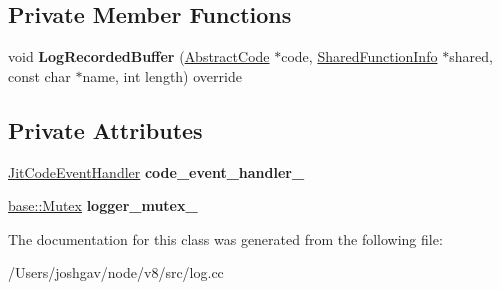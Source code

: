 \subsection*{Private Member Functions}
\begin{DoxyCompactItemize}
\item 
void {\bfseries Log\+Recorded\+Buffer} (\hyperlink{classv8_1_1internal_1_1_abstract_code}{Abstract\+Code} $\ast$code, \hyperlink{classv8_1_1internal_1_1_shared_function_info}{Shared\+Function\+Info} $\ast$shared, const char $\ast$name, int length) override\hypertarget{classv8_1_1internal_1_1_jit_logger_aa77a25ba8f66743339e93a18d75623e9}{}\label{classv8_1_1internal_1_1_jit_logger_aa77a25ba8f66743339e93a18d75623e9}

\end{DoxyCompactItemize}
\subsection*{Private Attributes}
\begin{DoxyCompactItemize}
\item 
\hyperlink{namespacev8_a39243bc91e63d64d111452fdb98c4733}{Jit\+Code\+Event\+Handler} {\bfseries code\+\_\+event\+\_\+handler\+\_\+}\hypertarget{classv8_1_1internal_1_1_jit_logger_a21feeb69c3f4c2ae489c875575c2a31a}{}\label{classv8_1_1internal_1_1_jit_logger_a21feeb69c3f4c2ae489c875575c2a31a}

\item 
\hyperlink{classv8_1_1base_1_1_mutex}{base\+::\+Mutex} {\bfseries logger\+\_\+mutex\+\_\+}\hypertarget{classv8_1_1internal_1_1_jit_logger_a55e1a27ecfb86de182f68e861445aa01}{}\label{classv8_1_1internal_1_1_jit_logger_a55e1a27ecfb86de182f68e861445aa01}

\end{DoxyCompactItemize}


The documentation for this class was generated from the following file\+:\begin{DoxyCompactItemize}
\item 
/\+Users/joshgav/node/v8/src/log.\+cc\end{DoxyCompactItemize}
